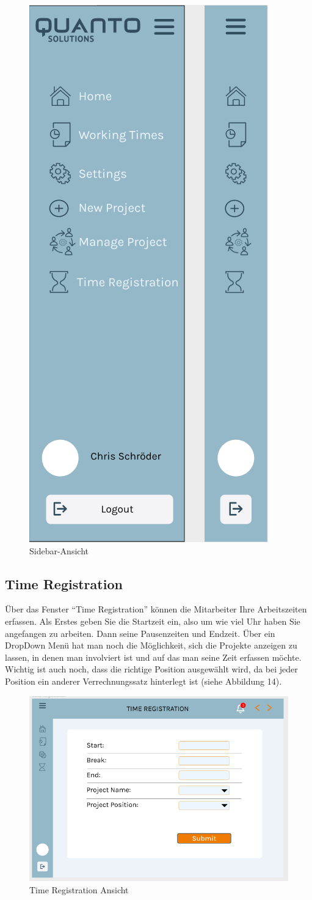 \documentclass{article}
\begin{document}
\begin{figure}[h]
    \includegraphics[height= 0.5\textwidth,width= \textwidth]{images/Sidebar.png}
    \caption{Sidebar-Ansicht}
    \label{fig:beispiel}
\end{figure}

\newpage
\subsection{Time Registration}
Über das Fenster “Time Registration” können die Mitarbeiter Ihre Arbeitszeiten erfassen.  Als Erstes geben Sie die Startzeit ein, also um wie viel Uhr haben Sie angefangen zu arbeiten. 
Dann seine Pausenzeiten und Endzeit. Über ein DropDown Menü hat man noch die Möglichkeit, sich die Projekte anzeigen zu lassen, in denen man involviert ist und auf das man seine Zeit erfassen möchte. 
Wichtig ist auch noch, dass die richtige Position ausgewählt wird, da bei jeder Position ein anderer Verrechnungssatz hinterlegt ist (siehe Abbildung 14).
\begin{figure}[h]
    \includegraphics[height= 0.5\textwidth,width= \textwidth]{images/Time Registration.png}
    \caption{Time Registration Ansicht}
    \label{fig:beispiel}
\end{figure}
\end{document}

